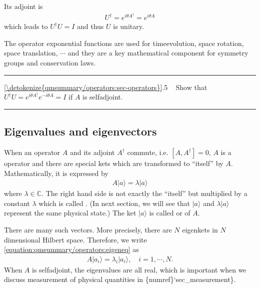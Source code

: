 \documentclass[letterpaper,10pt,english]{jupyterBook}
\begin{document}
\sphinxAtStartPar
Its adjoint is
\begin{equation*}
\begin{split}
U^\dagger = e^{i \theta A^\dagger} = e^{i \theta A}
\end{split}
\end{equation*}
\sphinxAtStartPar
which leads to \(U^\dagger U = I\) and thus \(U\) is unitary.

\sphinxAtStartPar
The operator exponential functions are used for time\sphinxhyphen{}evolution, space rotation, space translation, \(\cdots\) and they are a key mathematical component for symmetry groups and conservation laws.


\bigskip\hrule\bigskip


\sphinxAtStartPar
{} \hyperref[\detokenize{qmsummary/operators:sec-operators}]{\ref{\detokenize{qmsummary/operators:sec-operators}}}.5     Show that \(U^\dagger U = e^{i \theta A^\dagger} e^{-i \theta A} = I\) if \(A\) is self\sphinxhyphen{}adjoint.


\bigskip\hrule\bigskip



\subsection{Eigenvalues and eigenvectors}
\label{\detokenize{qmsummary/operators:eigenvalues-and-eigenvectors}}
\sphinxAtStartPar
When an operator \(A\) and its adjoint \(A^\dagger\) commute, i.e. \([A,A^\dagger]=0\), \(A\) is a  operator and there are special kets which are transformed to “itself”  by \(A\).  Mathematically, it is expressed by
\begin{equation}\label{equation:qmsummary/operators:eigeneq}
\begin{split}
A |a\rangle = \lambda |a\rangle
\end{split}
\end{equation}
\sphinxAtStartPar
where \(\lambda \in \mathbb{C}\).  The right hand side is not exactly the “itself” but multiplied by a constant \(\lambda\) which is called .  (In next section, we will see that \(|a\rangle \) and \(\lambda |a\rangle \) represent the same physical state.)  The ket \(|a\rangle\) is called  or  of \(A\).

\sphinxAtStartPar
There are many such vectors.  More precisely, there are \(N\) eigenkets in \(N\)\sphinxhyphen{}dimensional Hilbert space.  Therefore, we write \eqref{equation:qmsummary/operators:eigeneq} as
\begin{equation*}
\begin{split}
A |a_i\rangle  = \lambda_i |a_i\rangle , \quad i=1,\cdots, N.
\end{split}
\end{equation*}
\sphinxAtStartPar
When \(A\) is self\sphinxhyphen{}adjoint, the eigenvalues are all real, which is important when we discuss measurement of physical quantities in \{numref\}`sec\_measurement\}.
\end{document}
